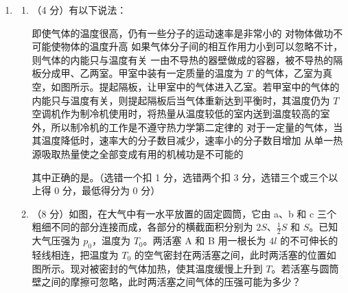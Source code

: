 \documentclass[\gkver]{gaokaozhenti}
\begin{document}
\begin{enumerate}
\onepicture[align=right, w=7.56cm]{}



\item
\begin{enumerate}
	\item
	（4 分）有以下说法：

	\onepicture[w=3.08cm]{}

	{即使气体的温度很高，仍有一些分子的运动速率是非常小的}
	{对物体做功不可能使物体的温度升高}
	{如果气体分子间的相互作用力小到可以忽略不计，则气体的内能只与温度有关}
	{一由不导热的器壁做成的容器，被不导热的隔板分成甲、乙两室。甲室中装有一定质量的温度为 $T$ 的气体，乙室为真空，如图所示。提起隔板，让甲室中的气体进入乙室。若甲室中的气体的内能只与温度有关，则提起隔板后当气体重新达到平衡时，其温度仍为 $T$}
	{空调机作为制冷机使用时，将热量从温度较低的室内送到温度较高的室外，所以制冷机的工作是不遵守热力学第二定律的}
	{对于一定量的气体，当其温度降低时，速率大的分子数目减少，速率小的分子数目增加}
	{从单一热源吸取热量使之全部变成有用的机械功是不可能的}

	其中正确的是。（选错一个扣 1 分，选错两个扣 3 分，选错三个或三个以上得 0 分，最低得分为 0 分）

	\item
	（8 分）如图，在大气中有一水平放置的固定圆筒，它由 a、b 和 c 三个粗细不同的部分连接而成，各部分的横截面积分别为 $2S$、$\frac{1}{2}S$ 和 $S$。已知大气压强为 $p_{0}$，温度为 $T_{0}$。两活塞 A 和 B 用一根长为 $4l$ 的不可伸长的轻线相连，把温度为 $T_{0}$ 的空气密封在两活塞之间，此时两活塞的位置如图所示。现对被密封的气体加热，使其温度缓慢上升到 $T$。若活塞与圆筒壁之间的摩擦可忽略，此时两活塞之间气体的压强可能为多少？


\end{enumerate}
\end{enumerate}
\end{document}
